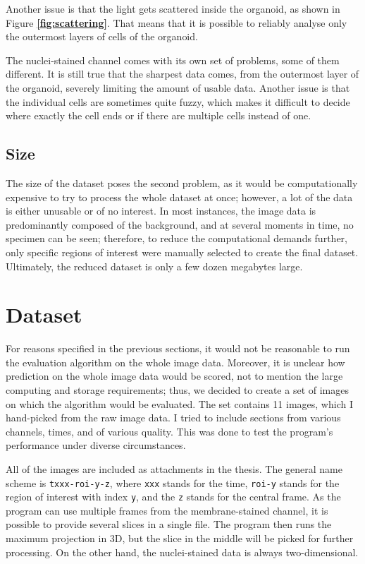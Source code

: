 \documentclass[
  digital,     %
  oneside,     %
  nosansbold,  %
  nocolorbold, %
  lof,         %
  lot,         %
]{fithesis4}
\begin{document}
Another issue is that the light gets scattered inside the organoid, as shown
in Figure \textbf{\ref{fig:scattering}}. That means that it is possible to reliably analyse only the
outermost layers of cells of the organoid.

The nuclei-stained channel comes with its own set of problems, some of them different.
It is still true that the sharpest data comes, from the outermost layer
of the organoid, severely limiting the amount of usable data. Another issue is that the
individual cells are sometimes quite fuzzy, which makes it difficult to decide where
exactly the cell ends or if there are multiple cells instead of one.

\subsection{Size}

The size of the dataset poses the second problem, as it would be computationally
expensive to try to process the whole dataset at once; however, a lot of the
data is either unusable or of no interest. In most instances, the image data is
predominantly composed of the background, and at several moments in time, no
specimen can be seen; therefore, to reduce the computational demands further,
only specific regions of interest were manually selected to create the final
dataset. Ultimately, the reduced dataset is only a few dozen megabytes large.

\section{Dataset}

For reasons specified in the previous sections, it would not be reasonable
to run the evaluation algorithm on the whole image data. Moreover, it is unclear
how prediction on the whole image data would be scored, not to mention the large
computing and storage requirements; thus, we decided to create a set of images
on which the algorithm would be evaluated. The set contains 11 images, which I
hand-picked from the raw image data. I tried to include sections from various
channels, times, and of various quality. This was done to test the
program's performance under diverse circumstances.

All of the images are included as attachments in the thesis. The general
name scheme is \texttt{txxx-roi-y-z}, where \texttt{xxx} stands for the time,
\texttt{roi-y} stands for the region of interest with index \texttt{y}, and the
\texttt{z} stands for the central frame. As the program can use
multiple frames from the membrane-stained channel, it is possible to provide
several slices in a single file. The program then runs the maximum projection
in 3D, but the slice in the middle will be picked for further processing. On the
other hand, the nuclei-stained data is always two-dimensional.
\end{document}
